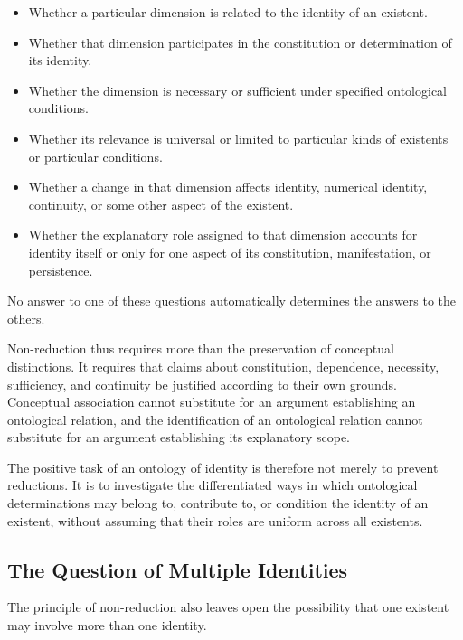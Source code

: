 \begin{itemize}
    \item Whether a particular dimension is related to
    the identity of an existent.

    \item Whether that dimension participates in the
    constitution or determination of its identity.

    \item Whether the dimension is necessary or sufficient
    under specified ontological conditions.

    \item Whether its relevance is universal or limited
    to particular kinds of existents or particular
    conditions.

    \item Whether a change in that dimension affects
    identity, numerical identity, continuity, or some
    other aspect of the existent.

    \item Whether the explanatory role assigned to that
    dimension accounts for identity itself or only for
    one aspect of its constitution, manifestation, or
    persistence.
\end{itemize}

No answer to one of these questions automatically
determines the answers to the others.

Non-reduction thus requires more than the preservation
of conceptual distinctions. It requires that claims
about constitution, dependence, necessity, sufficiency,
and continuity be justified according to their own
grounds. Conceptual association cannot substitute for
an argument establishing an ontological relation, and
the identification of an ontological relation cannot
substitute for an argument establishing its explanatory
scope.

The positive task of an ontology of identity is therefore
not merely to prevent reductions. It is to investigate
the differentiated ways in which ontological determinations
may belong to, contribute to, or condition the identity
of an existent, without assuming that their roles are
uniform across all existents.

\subsection{The Question of Multiple Identities}

The principle of non-reduction also leaves open the
possibility that one existent may involve more than one
identity.

